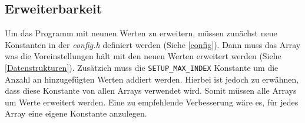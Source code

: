 \subsection{Erweiterbarkeit}
    Um das Programm mit neunen Werten zu erweitern, müssen zunächst neue
    Konstanten in der \textit{config.h} definiert werden (Siehe \ref{config}).
    Dann muss das Array was die Voreinstellungen hält mit den neuen Werten
    erweitert werden (Siehe \ref{Datenstrukturen}). 
    Zusätzich muss die \texttt{SETUP\_MAX\_INDEX} Konstante um die Anzahl an
    hinzugefügten Werten addiert werden. Hierbei ist jedoch zu erwähnen, dass
    diese Konstante von allen Arrays verwendet wird.
    Somit müssen alle Arrays um Werte erweitert werden.
    Eine zu empfehlende Verbesserung wäre es, für jedes Array eine eigene
    Konstante anzulegen.
